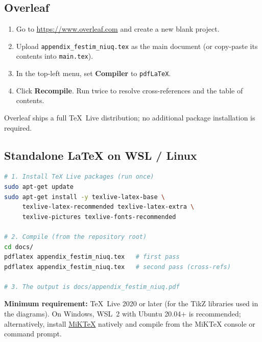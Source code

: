 \documentclass[11pt,a4paper]{article}
\begin{document}
\subsection{Overleaf}

\begin{enumerate}[nosep]
  \item Go to \url{https://www.overleaf.com} and create a new blank project.
  \item Upload \texttt{appendix\_festim\_niuq.tex} as the main document
        (or copy-paste its contents into \texttt{main.tex}).
  \item In the top-left menu, set \textbf{Compiler} to \texttt{pdfLaTeX}.
  \item Click \textbf{Recompile}.  Run twice to resolve cross-references
        and the table of contents.
\end{enumerate}

\noindent
Overleaf ships a full TeX~Live distribution; no additional package
installation is required.

\subsection{Standalone \LaTeX{} on WSL / Linux}

\begin{lstlisting}[language=bash]
# 1. Install TeX Live packages (run once)
sudo apt-get update
sudo apt-get install -y texlive-latex-base \
     texlive-latex-recommended texlive-latex-extra \
     texlive-pictures texlive-fonts-recommended

# 2. Compile (from the repository root)
cd docs/
pdflatex appendix_festim_niuq.tex   # first pass
pdflatex appendix_festim_niuq.tex   # second pass (cross-refs)

# 3. The output is docs/appendix_festim_niuq.pdf
\end{lstlisting}

\noindent
\textbf{Minimum requirement:} TeX~Live 2020 or later (for the TikZ
libraries used in the diagrams).  On Windows, WSL~2 with Ubuntu 20.04+
is recommended; alternatively, install
\href{https://miktex.org/}{MiKTeX} natively and compile from the
MiKTeX console or command prompt.

\end{document}
